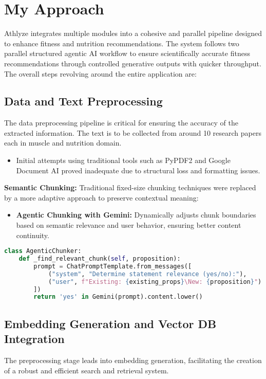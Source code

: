 \documentclass[conference]{IEEEtran}
\begin{document}
\section{My Approach}
Athlyze integrates multiple modules into a cohesive and parallel pipeline designed to enhance fitness and nutrition recommendations. The system follows two parallel structured agentic AI workflow to ensure scientifically accurate fitness recommendations through controlled generative outputs with quicker throughput. The overall steps revolving around the entire application are:

\subsection{Data and Text Preprocessing}
The data preprocessing pipeline is critical for ensuring the accuracy of the extracted information. The text is to be collected from around 10 research papers each in muscle and nutrition domain.

\begin{itemize}
    \item Initial attempts using traditional tools such as PyPDF2 and Google Document AI proved inadequate due to structural loss and formatting issues.
\end{itemize}

\textbf{Semantic Chunking:}
Traditional fixed-size chunking techniques were replaced by a more adaptive approach to preserve contextual meaning:
\begin{itemize}
    \item \textbf{Agentic Chunking with Gemini:} Dynamically adjusts chunk boundaries based on semantic relevance and user behavior, ensuring better content continuity.
\end{itemize}

\begin{lstlisting}[language=Python]
class AgenticChunker:
    def _find_relevant_chunk(self, proposition):
        prompt = ChatPromptTemplate.from_messages([
            ("system", "Determine statement relevance (yes/no):"),
            ("user", f"Existing: {existing_props}\New: {proposition}")
        ])
        return 'yes' in Gemini(prompt).content.lower()
\end{lstlisting}

\subsection{Embedding Generation and Vector DB Integration}
The preprocessing stage leads into embedding generation, facilitating the creation of a robust and efficient search and retrieval system.
\end{document}
